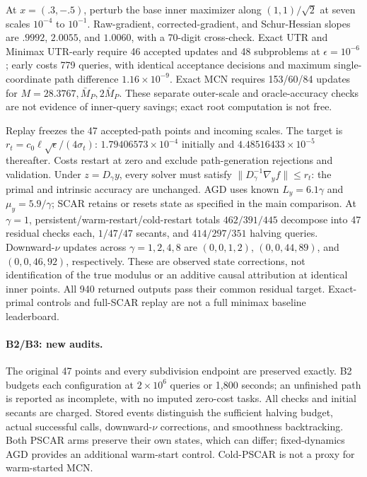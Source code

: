 \label{app:exp-b-controls}
At $x=(.3,-.5)$, perturb the base inner maximizer along $(1,1)/\sqrt2$
at seven scales $10^{-4}$ to $10^{-1}$. Raw-gradient, corrected-gradient,
and Schur-Hessian slopes are $.9992$, $2.0055$, and $1.0060$,
with a 70-digit cross-check. Exact UTR and Minimax UTR-early require
46 accepted updates and 48 subproblems at $\epsilon=10^{-6}$;
early costs 779 queries, with identical acceptance decisions and maximum
single-coordinate path difference $1.16\times10^{-9}$. Exact MCN requires
153/60/84 updates for $M=28.3767,\bar M_P,2\bar M_P$.
These separate outer-scale and oracle-accuracy checks are not evidence
of inner-query savings; exact root computation is not free.

Replay freezes the 47 accepted-path points and incoming scales.
The target is $r_t=c_0\ell\sqrt\epsilon/(4\sigma_t)$:
$1.79406573\times10^{-4}$ initially and $4.48516433\times10^{-5}$
thereafter. Costs restart at zero and exclude path-generation rejections
and validation. Under $z=D_\gamma y$, every solver must satisfy
$\|D_\gamma^{-1}\nabla_y f\|\le r_t$: the primal and intrinsic accuracy
are unchanged. AGD uses known $L_y=6.1\gamma$ and $\mu_y=5.9/\gamma$;
SCAR retains or resets state as specified in the main comparison.
At $\gamma=1$, persistent/warm-restart/cold-restart totals
$462/391/445$ decompose into 47 residual checks each, $1/47/47$
secants, and $414/297/351$ halving queries. Downward-$\nu$ updates
across $\gamma=1,2,4,8$ are $(0,0,1,2)$, $(0,0,44,89)$, and
$(0,0,46,92)$, respectively. These are observed state corrections,
not identification of the true modulus or an additive causal
attribution at identical inner points. All 940 returned outputs pass
their common residual target. Exact-primal controls and full-SCAR replay
are not a full minimax baseline leaderboard.

\paragraph{B2/B3: new audits.}
The original 47 points and every subdivision endpoint are preserved exactly.
B2 budgets each configuration at $2\times10^6$ queries or 1,800 seconds;
an unfinished path is reported as incomplete, with no imputed zero-cost tasks.
All checks and initial secants are charged. Stored events distinguish the
sufficient halving budget, actual successful calls, downward-$\nu$ corrections,
and smoothness backtracking. Both PSCAR arms preserve their own states, which
can differ; fixed-dynamics AGD provides an additional warm-start control.
Cold-PSCAR is not a proxy for warm-started MCN.

